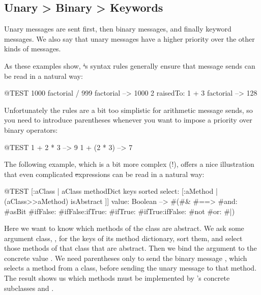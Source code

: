 \documentclass[a4paper,10pt,twoside]{book}
\begin{document}
\subsection*{Unary > Binary > Keywords}
Unary messages are sent first, then binary messages, and finally keyword messages. We also say that unary messages have a higher  priority over the other kinds of messages.


As these examples show, \st's syntax rules generally ensure that message sends can be read in a natural way:
\begin{code}{@TEST}
1000 factorial / 999 factorial --> 1000
2 raisedTo: 1 + 3 factorial     --> 128
\end{code}
\noindent

Unfortunately the rules are a bit too simplistic for arithmetic message sends, so you need to introduce parentheses whenever you want to impose a priority over binary operators:
\begin{code}{@TEST}
1 + 2 * 3   --> 9
1 + (2 * 3) --> 7
\end{code}

The following example, which is a bit more complex (!), offers a nice illustration that even complicated \st expressions can be read in a natural way:
\begin{code}{@TEST}
[:aClass | aClass methodDict keys sorted select: [:aMethod | (aClass>>aMethod) isAbstract ]] value: Boolean --> #(#& #==> #and: #asBit #ifFalse: #ifFalse:ifTrue: #ifTrue: #ifTrue:ifFalse: #not #or: #|)
\end{code}
\noindent
Here we want to know which methods of the  class are abstract.
We ask some argument class, , for the keys of its method dictionary, sort them, and select those methods of that class that are abstract.
Then we bind the argument  to the concrete value .
We need parentheses only to send the binary message \ct{>>}, which selects a method from a class, before sending the unary message \mbox{} to that method. The result shows us which methods must be implemented by 's concrete subclasses  and .

\end{document}

